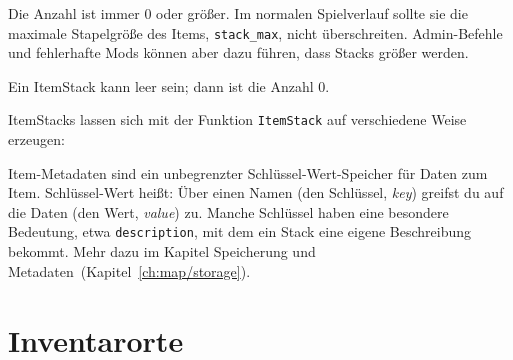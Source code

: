 Die Anzahl ist immer 0 oder größer. Im normalen Spielverlauf sollte sie
die maximale Stapelgröße des Items, \texttt{stack\_\allowbreak{}max},
nicht überschreiten. Admin-Befehle und fehlerhafte Mods können aber dazu
führen, dass Stacks größer werden.

\begin{Shaded}
\begin{Highlighting}[]
\OperatorTok{(}\OperatorTok{:}\OperatorTok{())}
\end{Highlighting}
\end{Shaded}

Ein ItemStack kann leer sein; dann ist die Anzahl 0.

\begin{Shaded}
\begin{Highlighting}[]
\OperatorTok{(}\OperatorTok{:}\OperatorTok{())}
\OperatorTok{:}\OperatorTok{(}\OperatorTok{)}
\end{Highlighting}
\end{Shaded}

ItemStacks lassen sich mit der Funktion \texttt{ItemStack} auf
verschiedene Weise erzeugen:

\begin{Shaded}
\begin{Highlighting}[]
\OperatorTok{()} 
\OperatorTok{(}\OperatorTok{)} 
\OperatorTok{(}\OperatorTok{)}
\OperatorTok{(\{}  \OperatorTok{=} \OperatorTok{,}  \OperatorTok{=}  \OperatorTok{\})}
\end{Highlighting}
\end{Shaded}

Item-Metadaten sind ein unbegrenzter Schlüssel-Wert-Speicher für Daten
zum Item. Schlüssel-Wert heißt: Über einen Namen (den Schlüssel,
\emph{key}) greifst du auf die Daten (den Wert, \emph{value}) zu. Manche
Schlüssel haben eine besondere Bedeutung, etwa \texttt{description}, mit
dem ein Stack eine eigene Beschreibung bekommt. Mehr dazu im Kapitel
Speicherung und Metadaten~(Kapitel~\ref{ch:map/storage}).

\section{Inventarorte}\label{inventarorte}

